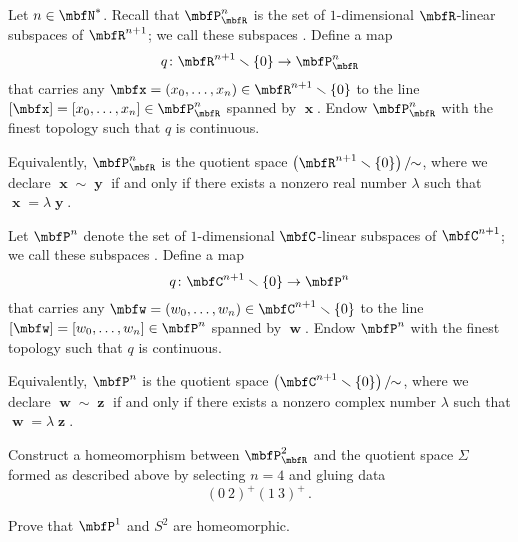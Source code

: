 \documentclass[a4paper,twoside,nols,nobib]{tufte-handout}
\begin{document}
\begin{ntn*}
	Let $n \in \NN^{\ast}$.
	Recall that $\PP_{\RR}^n$ is the set of $1$-dimensional $\RR$-linear subspaces of $\RR^{n+1}$;
	we call these subspaces .
	Define a map
	\[
		q \colon \RR^{n+1}\smallsetminus \{0\} \to \PP_{\RR}^n
	\]
	that carries any $\mbfx = (x_0,\dots,x_n) \in \RR^{n+1}\smallsetminus \{0\}$ to the line $[\mbfx] = [x_0,\dots,x_n] \in \PP_{\RR}^n$ spanned by $\mbfx$.
	Endow $\PP_{\RR}^n$ with the finest topology such that $q$ is continuous.

	Equivalently, $\PP_{\RR}^n$ is the quotient space $\left(\RR^{n+1}\smallsetminus \{0\}\right)/\!\!\sim$, where we declare $\mbfx \sim \mbfy$ if and only if there exists a nonzero real number $\lambda$ such that $\mbfx = \lambda \mbfy$.
	
	Let $\PP^n$ denote the set of $1$-dimensional $\CC$-linear subspaces of $\CC^{n+1}$;
	we call these subspaces .%
	Define a map
	\[
		q \colon \CC^{n+1}\smallsetminus \{0\} \to \PP^n
	\]
	that carries any $\mbfw = (w_0,\dots,w_n) \in \CC^{n+1}\smallsetminus \{0\}$ to the line $[\mbfw] = [w_0,\dots,w_n] \in \PP^n$ spanned by $\mbfw$.
	Endow $\PP^n$ with the finest topology such that $q$ is continuous.

	Equivalently, $\PP^n$ is the quotient space $\left(\CC^{n+1}\smallsetminus \{0\}\right)/\!\!\sim$, where we declare $\mbfw \sim \mbfz$ if and only if there exists a nonzero complex number $\lambda$ such that $\mbfw = \lambda \mbfz$.
\end{ntn*}


\begin{Problem}
	\noindent
	Construct a homeomorphism between $\PP^2_{\RR}$ and the quotient space $\Sigma$ formed as described above by selecting $n=4$ and gluing data
	\[
		(0\ 2)^+(1\ 3)^+ \period
	\]
\end{Problem}


\begin{Problem}
	\noindent
	Prove that $\PP^1$ and $S^2$ are homeomorphic.
\end{Problem}

\end{document}
